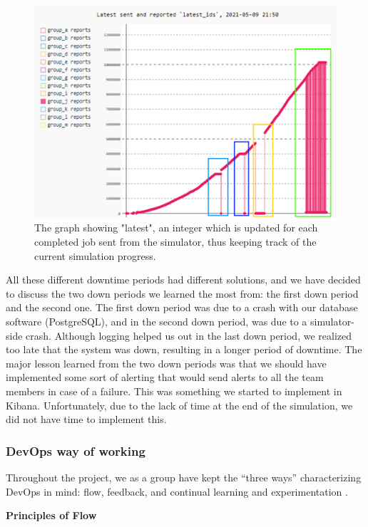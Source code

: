 \begin{figure}[h!]
    \centering
    \includegraphics[scale=0.7]{images/downperiodes.png}
    \caption{The graph showing "latest", an integer which is updated for each completed job sent from the simulator, 
    thus keeping track of the current simulation progress. }
\end{figure}
 
All these different downtime periods had different solutions, and we have decided to discuss the two down periods we 
learned the most from: the first down period and the second one. 
The first down period was due to a crash with our database software (PostgreSQL), and in the second down period, 
was due to a simulator-side crash. Although logging helped us out in the last down period, 
we realized too late that the system was down, resulting in a longer period of downtime. 
The major lesson learned from the two down periods was that we should have implemented some sort of alerting 
that would send alerts to all the team members in case of a failure. This was something we started to 
implement in Kibana. Unfortunately, due to the lack of time at the end of the simulation, we did not have time to implement this.

\subsubsection{DevOps way of working}
Throughout the project, we as a group have kept the “three ways” characterizing DevOps in mind: 
flow, feedback, and continual learning and experimentation \cite{devopshandbook}.

\textbf{Principles of Flow}

